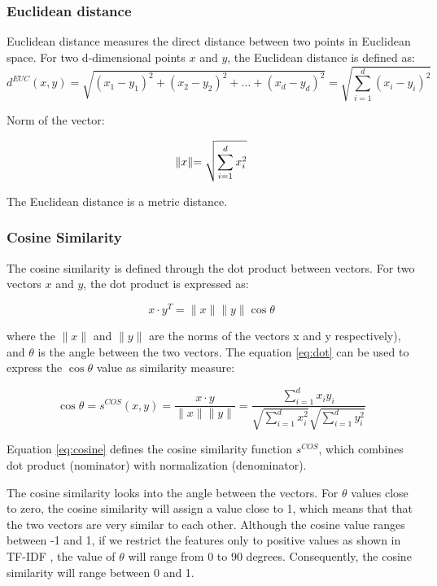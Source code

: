 \subsubsection{Euclidean distance}

Euclidean distance measures the direct distance between two points in Euclidean space. For two d-dimensional points $x$ and $y$, the Euclidean distance is defined as:
\begin{equation}
	d^{EUC}(x,y) = \sqrt{(x_{1} - y_{1})^{2} + (x_{2} - y_{2})^{2} + ... + (x_{d} - y_{d})^{2} } = \sqrt{\sum_{i=1}^{d} (x_{i}-y_{i})^{2}}
\end{equation}

  {Norm of the vector}:

\begin{equation}
	\lVert x\lVert = \sqrt{\sum_{i=1}^{d}x_{i}^{2}}
	\title{eq:norm}
\end{equation}

The Euclidean distance is a metric distance\cite{Deza.Deza2009EncyclopediaofDistances}.

\subsubsection{Cosine Similarity}
The cosine similarity is defined through the dot product between vectors. For two vectors $x$ and $y$, the dot product is expressed as:

\begin{equation}
	x\cdot y^{T} = \lVert x\lVert \lVert y\lVert \cos{\theta}
	\label{eq:dot}
\end{equation}


where the $\lVert x\lVert$ and $\lVert y\lVert$ are the norms of the vectors x and y respectively), 
and $\theta$ is the angle between the two vectors.
The equation \ref{eq:dot} can be used to express the $\cos \theta$ value as similarity measure:

\begin{equation}
	\cos \theta = s^{COS}(x,y) = \dfrac{x \cdot y}{\lVert x\lVert \lVert y\lVert} = 
	\dfrac{\sum_{i=1}^{d}x_{i}y_{i}}{\sqrt{\sum_{i=1}^{d} x_{i}^{2}}\sqrt{\sum_{i=1}^{d} y_{i}^{2}}}
	\label{eq:cosine}
\end{equation} 

Equation \ref{eq:cosine} defines the cosine similarity function $s^{COS}$, which combines dot product (nominator) with normalization (denominator).

The cosine similarity looks into the angle between the vectors. 
For $\theta$ values close to zero, the cosine similarity will assign a value close to 1, which means that that the two vectors are very similar to each other. 
Although the cosine value ranges between -1 and 1, if we restrict the features only to positive values as shown in TF-IDF 
, the value of $\theta$ will range from 0 to 90 degrees. 
Consequently, the cosine similarity will range between 0 and 1.

